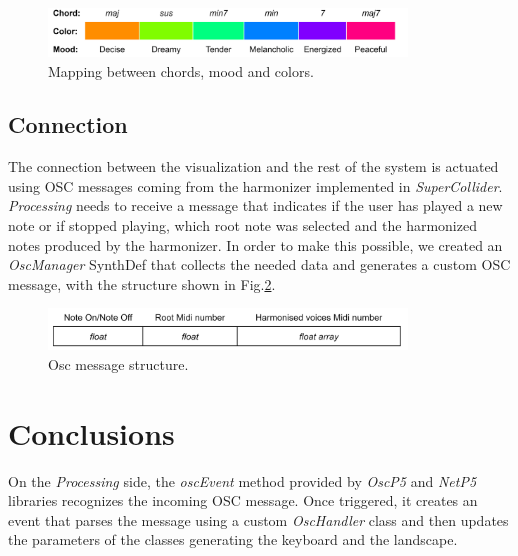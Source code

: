 \documentclass{article}
\begin{document}
\begin{figure}[H]
\centering
  \includegraphics[width=0.85\textwidth]{ChordColorMoodMapping.png}
    \caption{Mapping between chords, mood and colors.}
     \label{fig:ChordColorMoodMapping}
\end{figure}
\vspace{5pt}

\subsection{Connection}
The connection between the visualization and the rest of the system is actuated using OSC messages coming from the harmonizer implemented in \textit{SuperCollider}. \textit{Processing} needs to receive a message that indicates if the user has played a new note or if stopped playing, which root note was selected and the harmonized notes produced by the harmonizer. In order to make this possible, we created an \textit{OscManager} SynthDef that collects the needed data and generates a custom OSC message, with the structure shown in Fig.\ref{fig:OscMessageStructure}.

\begin{figure}[H]
\centering
  \includegraphics[width=0.85\textwidth]{OscMessageStructure.png}
    \caption{Osc message structure.}
     \label{fig:OscMessageStructure}
\end{figure}
\vspace{5pt}
\section{Conclusions}

On the \textit{Processing} side, the \textit{oscEvent} method provided by \textit{OscP5} and \textit{NetP5} libraries recognizes the incoming OSC message. Once triggered, it creates an event that parses the message using a custom \textit{OscHandler} class and then updates the parameters of the classes generating the keyboard and the landscape.
\end{document}
